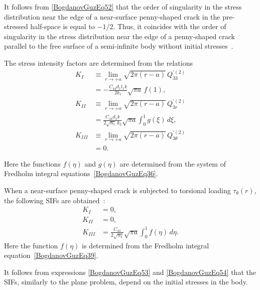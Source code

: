 It follows from \eqref{BogdanovGuzEq52} that the order of singularity in the
stress distribution near the edge of a near-surface penny-shaped crack in the
pre-stressed half-space is equal to $-1/2$. Thus, it coincides with the order
of singularity in the stress distribution near the edge of a penny-shaped
crack parallel to the free surface of a semi-infinite body without initial
stresses~\cite{BogdanovGuz43}.

The stress intensity factors are determined from the relations
\begin{equation}
	\label{BogdanovGuzEq53}
	\begin{aligned}
		K_{I}
		&\equiv
		\lim_{r\to +a}
			\sqrt{2\pi(r-a)}\,Q_{33}^{\prime(2)}
			\\
			& =
			-\frac{C_{44} d_{1} l_{1} k}{2k_{1}}
			\sqrt{\pi a}\,f(1),
		\\
		K_{II}
		&\equiv
			\lim_{r\to +a}
			\sqrt{2\pi(r-a)}\,Q_{3r}^{\prime(2)}
			\\[-0.5em]
			& =
			\frac{C_{44} d_{1} k}{2\sqrt{n_{1}}\,k_{2}}
			\sqrt{\pi a}
			\int_{0}^{1} g(\xi)\,d\xi ,
		\\
		K_{III}
		&\equiv
		\lim_{r\to +a}
			\sqrt{2\pi(r-a)}\,Q_{3\theta}^{\prime(2)}
			\\
			&=0.
	\end{aligned}
\end{equation}

Here the functions $f(\eta)$ and $g(\eta)$ are determined from the system of
Fredholm integral equations~\eqref{BogdanovGuzEq36}.

When a near-surface penny-shaped crack is subjected to torsional loading
$\tau_{\theta}(r)$, the following SIFs are obtained~\cite{BogdanovGuz32}:
\begin{equation}
	\label{BogdanovGuzEq54}
	\begin{aligned}
		K_{I}&=0,
		\\[4pt]
		K_{II}&=0,
		\\
		K_{III}
		&=
		\displaystyle
		\frac{C_{44}}{2\sqrt{n_{3}}}
		\sqrt{\pi a}
		\int_{0}^{1} f(\eta)\,d\eta .
	\end{aligned}
\end{equation}
%
Here the function $f(\eta)$ is determined from the Fredholm integral
equation~\eqref{BogdanovGuzEq39}.

It follows from expressions \eqref{BogdanovGuzEq53} and
\eqref{BogdanovGuzEq54} that the SIFs, similarly to the
plane problem, depend on the initial stresses in the body.


